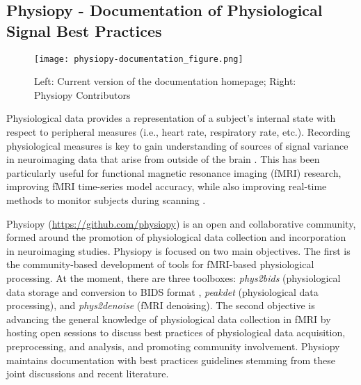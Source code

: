 \documentclass[../main.tex]{subfiles}
\begin{document}
\subsection{Physiopy - Documentation of Physiological Signal Best Practices}


\begin{figure*}
	\centering
	\texttt{[image: physiopy-documentation\_figure.png]}
	\caption{Left: Current version of the documentation homepage; Right: Physiopy Contributors}
	\label{fig:physiopy_beforeafter}
\end{figure*}

Physiological data provides a representation of a subject’s internal state with respect to peripheral measures (i.e., heart rate, respiratory rate, etc.). Recording physiological measures is key to gain understanding of sources of signal variance in neuroimaging data that arise from outside of the brain \citep{chen2020}. This has been particularly useful for functional magnetic resonance imaging (fMRI) research, improving fMRI time-series model accuracy, while also improving real-time methods to monitor subjects during scanning \citep{bulte2017, caballero-gaudes2017}. 

Physiopy (\url{https://github.com/physiopy}) is an open and collaborative community, formed around the promotion of physiological data collection and incorporation in neuroimaging studies. Physiopy is focused on two main objectives. The first is the community-based development of tools for fMRI-based physiological processing. At the moment, there are three toolboxes: \textit{phys2bids} (physiological data storage and conversion to BIDS format \citep{phys2bids}, \textit{peakdet} (physiological data processing), and \textit{phys2denoise} (fMRI denoising). The second objective is advancing the general knowledge of physiological data collection in fMRI by hosting open sessions to discuss best practices of physiological data acquisition, preprocessing, and analysis, and promoting community involvement. Physiopy maintains documentation with best practices guidelines stemming from these joint discussions and recent literature.
\end{document}
